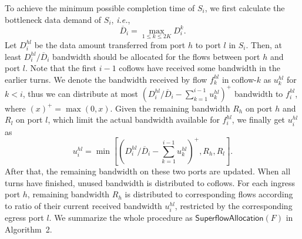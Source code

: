\documentclass[10pt, conference, letterpaper]{IEEEtran}
\begin{document}
To achieve the minimum possible completion time of $S_i$, we first calculate the bottleneck data demand of $S_i$, \emph{i.e.},
\begin{equation}
	\overline{D}_i = \max_{1\leq k\leq 2K}D_i^k.
\end{equation}
Let $D_i^{hl}$ be the data amount transferred from port $h$ to port $l$ in $S_i$. Then, at least $D_i^{hl}/\overline{D}_i$ bandwidth should be allocated for the flows between port $h$ and port $l$. Note that the first $i-1$ coflows have received some bandwidth in the earlier turns. We denote the bandwidth received by flow $f_k^{hl}$ in coflow-$k$ as $u_k^{hl}$ for $k < i$, thus we can distribute at most $(D_i^{hl}/\overline{D}_i - \sum_{k=1}^{i-1}u_k^{hl})^+$ bandwidth to $f_i^{hl}$, where $(x)^+=\max(0,x)$. Given the remaining bandwidth $R_h$ on port $h$ and $R_l$ on port $l$, which limit the actual bandwidth available for $f_i^{hl}$, we finally get $u_i^{hl}$ as
\begin{equation}
	u_i^{hl} = \min[(D_i^{hl}/\overline{D}_i - \sum_{k=1}^{i-1}u_k^{hl})^+,R_h,R_l].
\end{equation}
After that, the remaining bandwidth on these two ports are updated. When all turns have finished, unused bandwidth is distributed to coflows. For each ingress port $h$, remaining bandwidth $R_h$ is distributed to corresponding flows according to ratio of their current received bandwidth $u_i^{hl}$, restricted by the corresponding egress port $l$. We summarize the whole procedure as $\mathsf{SuperflowAllocation}(F)$ in Algorithm~2.
\end{document}
